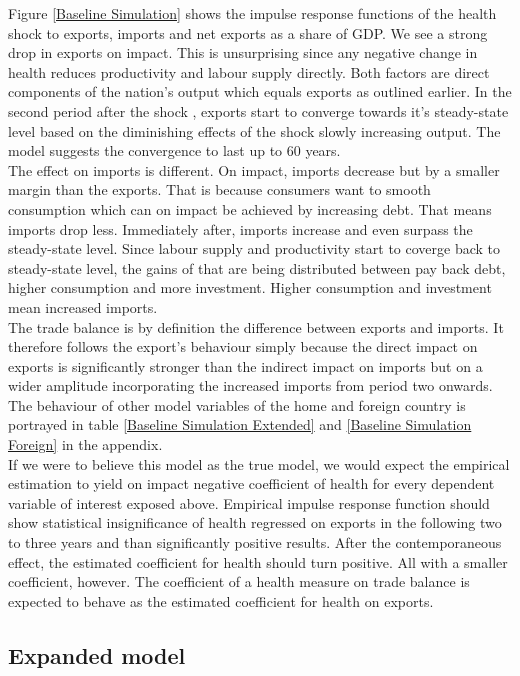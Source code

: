 \documentclass{article}
\begin{document}
Figure \ref{Baseline Simulation} shows the impulse response functions of the health shock to exports, imports and net exports as a share of GDP. We see a strong drop in exports on impact. This is unsurprising since any negative change in health reduces productivity and labour supply directly. Both factors are direct components of the nation's output which equals exports as outlined earlier. In the second period after the shock , exports start to converge towards it's steady-state level based on the diminishing effects of the shock slowly increasing output. The model suggests the convergence to last up to 60 years. \\
The effect on imports is different. On impact, imports decrease but by a smaller margin than the exports. That is because consumers want to smooth consumption which can on impact be achieved by increasing debt. That means imports drop less. Immediately after, imports increase and even surpass the steady-state level. Since labour supply and productivity start to coverge back to steady-state level, the gains of that are being distributed between pay back debt, higher consumption and more investment. Higher consumption and investment mean increased imports.\\
The trade balance is by definition the difference between exports and imports. It therefore follows the export's behaviour simply because the direct impact on exports is significantly stronger than the indirect impact on imports but on a wider amplitude incorporating the increased imports from period two onwards. The behaviour of other model variables of the home and foreign country is portrayed in table \ref{Baseline Simulation Extended} and \ref{Baseline Simulation Foreign} in the appendix. \\
If we were to believe this model as the true model, we would expect the empirical estimation to yield on impact negative coefficient of health for every dependent variable of interest exposed above. Empirical impulse response function should show statistical insignificance of health regressed on exports in the following two to three years and than significantly positive results. After the contemporaneous effect, the estimated coefficient for health should turn positive. All with a smaller coefficient, however. The coefficient of a health measure on trade balance is expected to behave as the estimated coefficient for health on exports.

\subsection{Expanded model}
\end{document}
